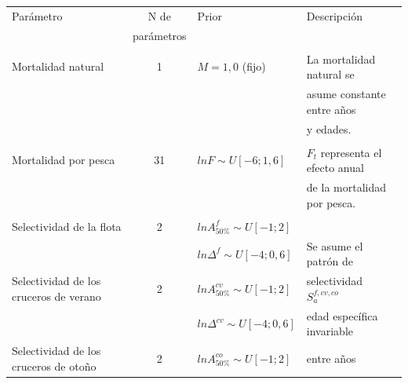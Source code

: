\documentclass[
  spanish,
]{article}
\begin{document}
\begin{table}[h]
    \centering
    \resizebox{17cm}{!} {
    \begin{tabular}{|l|c|l|l|}
    \hline
Parámetro                                 & N de       & Prior                                            & Descripción \\ 
                                          & parámetros &                                                  &             \\ \hline
                                          &            &                                                  & \\
Mortalidad natural                        & 1          & $M=1,0$ (fijo)                                   & La mortalidad natural se \\
                                          &            &                                                  & asume constante entre años \\
                                          &            &                                                  & y edades. \\
                                          &            &                                                  & \\\hline
Mortalidad por pesca                      & 31         & $lnF \sim U[-6;1,6]$                             & $F_t$ representa el efecto anual \\
                                          &            &                                                  & de la mortalidad por pesca. \\
                                          &            &                                                  & \\ \hline
Selectividad de la flota                  &  2         & $lnA_{50\%}^f \sim U[-1;2]$                      & \\
                                          &            & $ln\Delta^f \sim U[-4;0,6]$                      & Se asume el patrón de \\
Selectividad de los cruceros de verano    &  2         & $lnA_{50\%}^{cv} \sim U[-1;2]$                   & selectividad $S_a^{f,cv,co}$\\
                                          &            & $ln\Delta^{cv} \sim U[-4;0,6]$                   & edad específica invariable  \\
Selectividad de los cruceros de otoño     &  2         & $lnA_{50\%}^{co} \sim U[-1;2]$                   & entre años \\

\end{tabular}}
\end{table}
\end{document}

